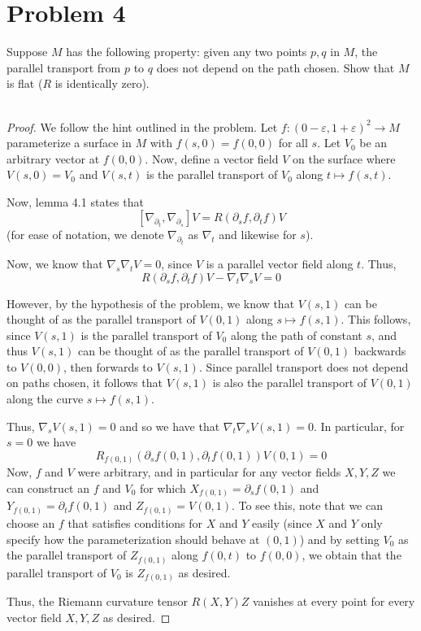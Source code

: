 \documentclass[fontsize=11pt]{scrartcl} %
\numberwithin{equation}{section} %
\numberwithin{figure}{section} %
\numberwithin{table}{section} %
\begin{document}
\section*{Problem 4}
Suppose $M$ has the following property: given any two points $p,q$ in $M$, the
parallel transport from $p$ to $q$ does not depend on the path chosen. Show that
$M$ is flat ($R$ is identically zero).
\\
\\
\begin{proof}
    We follow the hint outlined in the problem. Let
    $f:(0-\varepsilon,1+\varepsilon)^2\to M$ parameterize a surface in $M$ with
    $f(s,0) = f(0,0)$ for all $s$. Let $V_0$ be an arbitrary vector at $f(0,0)$.
    Now, define a vector field $V$ on the surface where $V(s,0) = V_0$ and
    $V(s,t)$ is the parallel transport of $V_0$ along $t\mapsto f(s,t)$.

    Now, lemma 4.1 states that
    \[
        [\nabla_{\partial_t},\nabla_{\partial_s}]V =
        R(\partial_sf,\partial_tf)V
    \]
    (for ease of notation, we denote $\nabla_{\partial_t}$ as $\nabla_t$ and
    likewise for $s$).

    Now, we know that $\nabla_s\nabla_tV=0$, since $V$ is a parallel vector
    field along $t$. Thus,
    \[
        R(\partial_sf,\partial_tf)V - \nabla_t\nabla_sV = 0
    \]

    However, by the hypothesis of the problem, we know that $V(s,1)$ can be
    thought of as the parallel transport of $V(0,1)$ along $s\mapsto f(s,1)$.
    This follows, since $V(s,1)$ is the parallel transport of $V_0$ along the
    path of constant $s$, and thus $V(s,1)$ can be thought of as the parallel
    transport of $V(0,1)$ backwards to $V(0,0)$, then forwards to $V(s,1)$.
    Since parallel transport does not depend on paths chosen, it follows that
    $V(s,1)$ is also the parallel transport of $V(0,1)$ along the curve
    $s\mapsto f(s,1)$.

    Thus, $\nabla_sV(s,1) = 0$ and so we have that $\nabla_t\nabla_sV(s,1)=0$.
    In particular, for $s=0$ we have
    \[
        R_{f(0,1)}(\partial_sf(0,1),\partial_tf(0,1))V(0,1) = 0
    \]
    Now, $f$ and $V$ were arbitrary, and in particular for any vector fields
    $X,Y,Z$ we can construct an $f$ and $V_0$ for which $X_{f(0,1)}=
    \partial_sf(0,1)$ and $Y_{f(0,1)} = \partial_tf(0,1)$ and $Z_{f(0,1)} =
    V(0,1)$. To see this, note that we can choose an $f$ that satisfies
    conditions for $X$ and $Y$ easily (since $X$ and $Y$ only specify how the
    parameterization should behave at $(0,1)$) and by setting $V_0$ as the
    parallel transport of $Z_{f(0,1)}$ along $f(0,t)$ to $f(0,0)$, we obtain
    that the parallel transport of $V_0$ is $Z_{f(0,1)}$ as desired.

    Thus, the Riemann curvature tensor $R(X,Y)Z$ vanishes at every point for
    every vector field $X,Y,Z$ as desired.
\end{proof}
\end{document}
